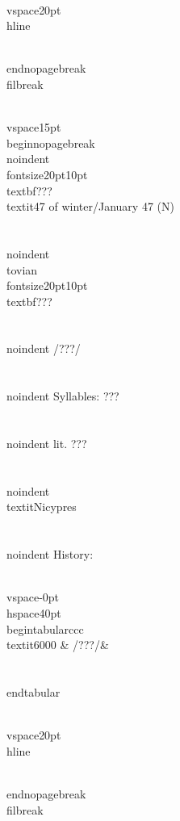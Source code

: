 \\vspace{20pt}\\hline

\\end{nopagebreak}
\\filbreak



\\vspace{15pt}
\\begin{nopagebreak}
\\noindent{\\fontsize{20pt}{10pt}\\textbf{???} } \\textit{47 of winter/January 47} (N)\\\\
\\noindent {\\tovian \\fontsize{20pt}{10pt} \\textbf{???} }\\\\
\\noindent /???/\\\\
\\noindent Syllables: ???\\\\
\\noindent lit. ???\\\\
\\noindent \\textit{Nicypres}\\\\


\\noindent History:

\\vspace{-0pt}
\\hspace{40pt}
\\begin{tabular}{ccc}
\\textit{6000} & /???/& \\\\
\\end{tabular}

\\vspace{20pt}\\hline

\\end{nopagebreak}
\\filbreak



